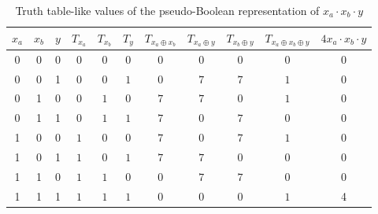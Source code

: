 \documentclass[a4paper]{article}
\begin{document}
\begin{table*}[t]
  \begin{minipage}{\textwidth}
    \begin{center}
      \scalebox{1.0} {
        \begin{tabular}{c|c|c|c|c|c|c|c|c|c|c}
          $x_a$ & $x_b$ & $y$ & $T_{x_a}$ & $T_{x_b}$ & $T_{y}$ & $T_{x_a \oplus x_b}$ & $T_{x_a \oplus y}$ & $T_{x_b \oplus y}$ & $T_{x_a \oplus x_b \oplus y}$ & $4x_a \cdot x_b \cdot y$\\\hline
          0     & 0     & 0   & 0         & 0         & 0       & 0                    & 0                  & 0                  & 0                             & 0            \\\hline
          0     & 0     & 1   & 0         & 0         & $1$   & 0                    & $7$             & $7$
                       & $1$                         & 0            \\\hline
          0     & 1     & 0   & 0         & $1$     & 0       & $7$               & $7$             & 0                  & $1$                         & 0            \\\hline
          0     & 1     & 1   & 0         & $1$     & $1$   & $7$               & 0                  & $7$             & 0                             & 0            \\\hline
          1     & 0     & 0   & $1$     & 0         & 0       & $7$               & 0                  & $7$             & $1$                         & 0            \\\hline
          1     & 0     & 1   & $1$     & 0         & $1$   & $7$               & $7$             & 0                  & 0                             & 0            \\\hline
          1     & 1     & 0   & $1$     & $1$     & 0       & 0                    & $7$             & $7$             & 0                             & 0            \\\hline
          1     & 1     & 1   & $1$     & $1$     & $1$   & 0                    & 0                  & 0                  & $1$                         & 4            \\\hline
        \end{tabular}
      }
      \caption{Truth table-like values of the pseudo-Boolean representation of $x_a \cdot x_b \cdot y$}
      \label{table-pseudo-toff}
    \end{center}
  \end{minipage}
  
\end{table*}
\end{document}
